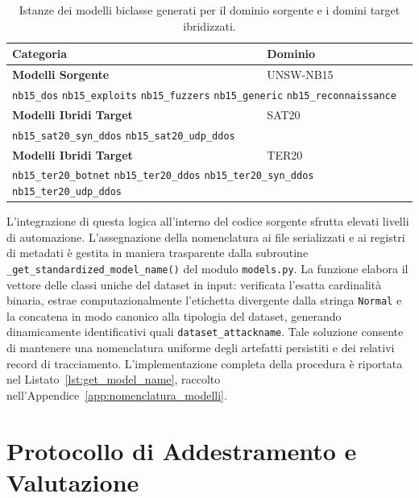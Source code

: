 \begin{table}[H]
    \centering
    \small
    \caption{Istanze dei modelli biclasse generati per il dominio sorgente e i domini target ibridizzati.}
    \label{tab:biclass_models_summary}
    \begin{tabularx}{\textwidth}{l >{\raggedright\arraybackslash}X}
        \toprule
        \textbf{Categoria} & \textbf{Dominio} \\
        \midrule
        \textbf{Modelli Sorgente} & UNSW-NB15 \\
        \multicolumn{2}{l}{\texttt{nb15\_dos} \quad \texttt{nb15\_exploits} \quad \texttt{nb15\_fuzzers} \quad \texttt{nb15\_generic} \quad \texttt{nb15\_reconnaissance}} \\
        \textbf{Modelli Ibridi Target} & SAT20 \\
        \multicolumn{2}{l}{\texttt{nb15\_sat20\_syn\_ddos} \quad \texttt{nb15\_sat20\_udp\_ddos}} \\
        \textbf{Modelli Ibridi Target} & TER20 \\
        \multicolumn{2}{l}{\texttt{nb15\_ter20\_botnet} \quad \texttt{nb15\_ter20\_ddos} \quad \texttt{nb15\_ter20\_syn\_ddos} \quad \texttt{nb15\_ter20\_udp\_ddos}} \\
        \bottomrule
    \end{tabularx}
\end{table}

L'integrazione di questa logica all'interno del codice sorgente sfrutta elevati livelli di automazione. 
L'assegnazione della nomenclatura ai file serializzati e ai registri di metadati è gestita in maniera trasparente dalla subroutine \texttt{\_get\_standardized\_model\_name()} del modulo \texttt{models.py}. 
La funzione elabora il vettore delle classi uniche del dataset in input: verificata l'esatta cardinalità binaria, estrae computazionalmente l'etichetta divergente dalla stringa \texttt{Normal} e la concatena in modo canonico alla tipologia del dataset, generando dinamicamente identificativi quali \texttt{dataset\_attackname}. 
Tale soluzione consente di mantenere una nomenclatura uniforme degli artefatti persistiti e dei relativi record di tracciamento. 
L'implementazione completa della procedura è riportata nel Listato~\ref{lst:get_model_name}, raccolto nell'Appendice~\ref{app:nomenclatura_modelli}.


\section{Protocollo di Addestramento e Valutazione}
\label{sec:protocollo_addestramento_valutazione}

